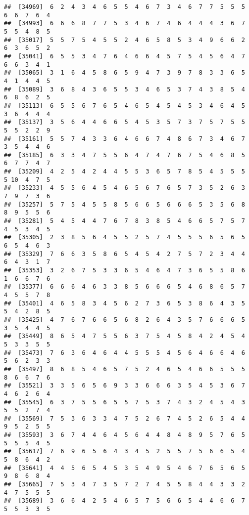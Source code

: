 \documentclass[
]{book}
\begin{document}
\begin{verbatim}
##  [34969]  6  2  4  3  4  6  5  5  4  6  7  3  4  6  7  7  5  5  5  6  6  7  6  4
##  [34993]  6  6  6  8  7  7  5  3  4  6  7  4  6  4  4  4  3  6  7  5  5  4  8  5
##  [35017]  5  5  7  5  4  5  5  2  4  6  5  8  5  3  4  9  6  6  2  6  3  6  5  2
##  [35041]  6  5  5  3  4  7  6  4  6  6  4  5  7  5  4  5  6  4  7  6  6  3  4  1
##  [35065]  3  1  6  4  5  8  6  5  9  4  7  3  9  7  8  3  3  6  5  4  1  4  4  5
##  [35089]  3  6  8  4  3  6  5  5  3  4  6  5  3  7  4  3  8  5  4  6  8  6  2  5
##  [35113]  6  5  5  6  7  6  5  4  6  5  4  5  4  5  3  4  6  4  5  3  6  4  4  4
##  [35137]  3  5  6  4  4  6  6  5  4  5  3  5  7  3  7  5  7  5  5  5  5  2  2  9
##  [35161]  5  5  7  4  3  3  6  4  6  6  7  4  8  6  7  3  4  6  7  3  5  4  4  6
##  [35185]  6  3  3  4  7  5  5  6  4  7  4  7  6  7  5  4  6  8  5  6  7  7  4  7
##  [35209]  4  2  5  4  2  4  4  5  5  3  6  5  7  8  5  4  5  5  5  5 10  4  7  5
##  [35233]  4  5  5  6  4  5  4  6  5  6  7  6  5  7  3  5  2  6  3  7  9  7  3  6
##  [35257]  5  7  5  4  5  5  8  5  6  6  5  6  6  6  5  3  5  6  8  8  9  5  5  6
##  [35281]  5  4  5  4  4  7  6  7  8  3  8  5  4  6  6  5  7  5  7  4  5  3  4  5
##  [35305]  2  3  8  5  6  4  5  5  2  5  7  4  5  5  5  6  5  6  5  6  5  4  6  3
##  [35329]  7  6  6  3  5  8  6  5  4  5  4  2  7  5  7  2  3  4  4  6  4  3  1  7
##  [35353]  3  2  6  7  5  3  3  6  5  4  6  4  7  3  6  5  5  8  6  1  6  6  7  6
##  [35377]  6  6  6  4  6  3  3  8  5  6  6  6  5  4  6  8  6  5  7  4  5  5  7  8
##  [35401]  4  6  5  8  3  4  5  6  2  7  3  6  5  3  8  6  4  3  5  5  4  2  8  5
##  [35425]  4  7  6  7  6  6  5  6  8  2  6  4  3  5  7  6  6  6  5  3  5  4  4  5
##  [35449]  8  6  5  4  7  5  5  6  3  7  5  4  5  8  4  2  4  5  4  5  3  3  5  5
##  [35473]  7  6  3  6  4  6  4  4  5  5  5  4  5  6  4  6  6  4  6  5  6  2  3  3
##  [35497]  8  6  8  5  4  6  5  7  5  2  4  6  5  4  6  6  5  5  5  8  6  6  7  6
##  [35521]  3  3  5  6  5  6  9  3  3  6  6  6  3  5  4  5  3  6  7  4  6  2  6  4
##  [35545]  6  3  7  5  5  6  5  5  7  5  3  7  4  3  2  4  5  4  3  5  5  2  7  4
##  [35569]  7  5  3  6  3  3  4  7  5  2  6  7  4  5  2  6  5  4  4  9  5  2  5  5
##  [35593]  3  6  7  4  4  6  4  5  6  4  4  8  4  8  9  5  7  6  5  5  5  5  4  5
##  [35617]  7  6  9  6  5  6  4  3  4  5  2  5  5  7  5  6  6  5  4  5  8  6  4  2
##  [35641]  4  4  5  6  5  4  5  3  5  4  9  5  4  6  7  6  5  6  5  9  8  6  8  4
##  [35665]  7  5  3  4  7  3  5  7  2  7  4  5  5  8  4  4  3  3  2  4  7  5  5  5
##  [35689]  3  6  6  4  2  5  4  6  5  7  5  6  6  5  4  4  6  6  7  5  5  3  3  5

\end{verbatim}
\end{document}
